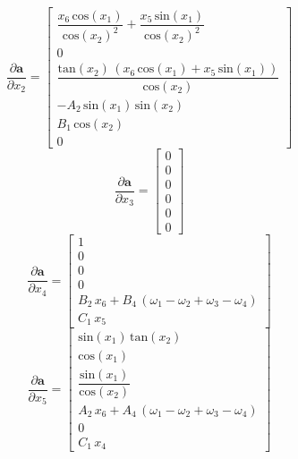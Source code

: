 \begin{equation}
	\dfrac{\partial \boldsymbol{ a}}{\partial  x_2} = 
	\begin{bmatrix}
	\dfrac{x_6 \,\mathrm{cos}\left(x_1 \right)}{{\mathrm{cos}\left(x_2 \right)}^2 }+\dfrac{x_5 \,\mathrm{sin}\left(x_1 \right)}{{\mathrm{cos}\left(x_2 \right)}^2 }\\
	0\\[0.5em]
	\dfrac{\mathrm{tan}\left(x_2 \right)\,{\left(x_6 \,\mathrm{cos}\left(x_1 \right)+x_5 \,\mathrm{sin}\left(x_1 \right)\right)}}{\mathrm{cos}\left(x_2 \right)}\\
	-A_2 \,\mathrm{sin}\left(x_1 \right)\,\mathrm{sin}\left(x_2 \right)\\
	B_1 \,\mathrm{cos}\left(x_2 \right)\\
	0
	\end{bmatrix}
\end{equation}
\begin{equation}
	\dfrac{\partial \boldsymbol{ a}}{\partial  x_3} = 
	\begin{bmatrix}
		0\\0\\0\\0\\0\\0
	\end{bmatrix}
\end{equation}
\begin{equation}
	\dfrac{\partial \boldsymbol{ a}}{\partial  x_4} = 
	\begin{bmatrix}
	1\\
	0\\
	0\\
	0\\
	B_2 \,x_6 +B_4 \,{\left(\omega_1 -\omega_2 +\omega_3 -\omega_4 \right)}\\
	C_1 \,x_5 
	\end{bmatrix}
\end{equation}
\begin{equation}
	\dfrac{\partial \boldsymbol{ a}}{\partial  x_5} = 
	\begin{bmatrix}
	\mathrm{sin}\left(x_1 \right)\,\mathrm{tan}\left(x_2 \right)\\
	\mathrm{cos}\left(x_1 \right)\\
	\dfrac{\mathrm{sin}\left(x_1 \right)}{\mathrm{cos}\left(x_2 \right)}\\
	A_2 \,x_6 +A_4 \,{\left(\omega_1 -\omega_2 +\omega_3 -\omega_4 \right)}\\
	0\\
	C_1 \,x_4 
	\end{bmatrix}
\end{equation}
